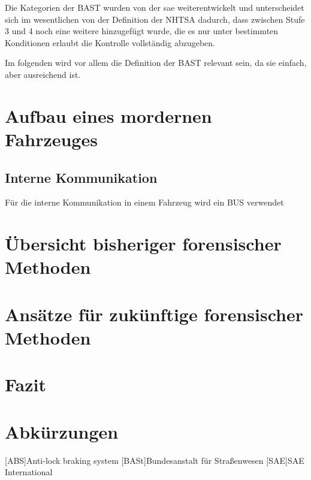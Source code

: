 \documentclass[conference,compsoc,final,a4paper]{IEEEtran}
\begin{document}
Die Kategorien der \ac{BAST} wurden von der \ac{sae} weiterentwickelt \cite{bast2021} und unterscheidet sich im wesentlichen von der Definition der \ac{NHTSA} dadurch, dass zwischen Stufe 3 und 4 noch eine weitere hinzugefügt wurde, die es nur unter bestimmten Konditionen erlaubt die Kontrolle vollständig abzugeben\cite{SAE2021}.

Im folgenden wird vor allem die Definition der \ac{BAST} relevant sein, da sie einfach, aber ausreichend ist.

\section{Aufbau eines mordernen Fahrzeuges}
\subsection{Interne Kommunikation}
Für die interne Kommunikation in einem Fahrzeug wird ein BUS verwendet

\section{Übersicht bisheriger forensischer Methoden}
\section{Ansätze für zukünftige forensischer Methoden}
\section{Fazit}
\section*{Abkürzungen}

\begin{acronym}[IEEE]
  [ABS]{Anti-lock braking system}
  [BASt]{Bundesanstalt für Straßenwesen}
  [SAE]{SAE International}
\end{acronym}

\printbibliography
\end{document}
